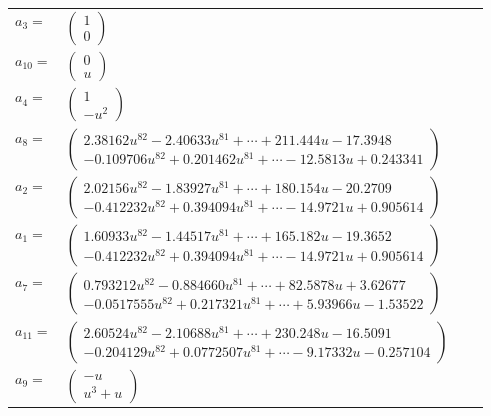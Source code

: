 \documentclass[1p]{elsarticle_modified}
\theoremstyle{definition}
\begin{document}
\begin{tabular}{m{7pt} m{180pt} m{7pt} m{180pt} }
\flushright $a_{3}=$&$\begin{pmatrix}1\\0\end{pmatrix}$ \\
\flushright $a_{10}=$&$\begin{pmatrix}0\\u\end{pmatrix}$ \\
\flushright $a_{4}=$&$\begin{pmatrix}1\\- u^2\end{pmatrix}$ \\
\flushright $a_{8}=$&$\begin{pmatrix}2.38162 u^{82}-2.40633 u^{81}+\cdots+211.444 u-17.3948\\-0.109706 u^{82}+0.201462 u^{81}+\cdots-12.5813 u+0.243341\end{pmatrix}$ \\
\flushright $a_{2}=$&$\begin{pmatrix}2.02156 u^{82}-1.83927 u^{81}+\cdots+180.154 u-20.2709\\-0.412232 u^{82}+0.394094 u^{81}+\cdots-14.9721 u+0.905614\end{pmatrix}$ \\
\flushright $a_{1}=$&$\begin{pmatrix}1.60933 u^{82}-1.44517 u^{81}+\cdots+165.182 u-19.3652\\-0.412232 u^{82}+0.394094 u^{81}+\cdots-14.9721 u+0.905614\end{pmatrix}$ \\
\flushright $a_{7}=$&$\begin{pmatrix}0.793212 u^{82}-0.884660 u^{81}+\cdots+82.5878 u+3.62677\\-0.0517555 u^{82}+0.217321 u^{81}+\cdots+5.93966 u-1.53522\end{pmatrix}$ \\
\flushright $a_{11}=$&$\begin{pmatrix}2.60524 u^{82}-2.10688 u^{81}+\cdots+230.248 u-16.5091\\-0.204129 u^{82}+0.0772507 u^{81}+\cdots-9.17332 u-0.257104\end{pmatrix}$ \\
\flushright $a_{9}=$&$\begin{pmatrix}- u\\u^3+u\end{pmatrix}$ \\

\end{tabular}
\end{document}
